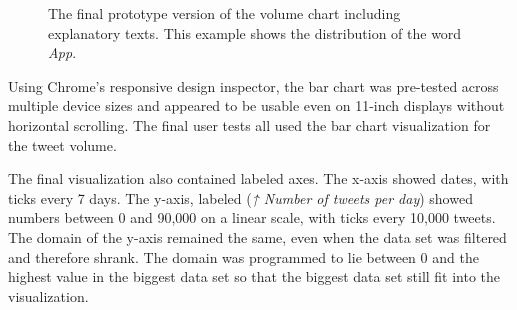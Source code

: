 \begin{figure}[htb!]
    \caption{The final prototype version of the volume chart including explanatory texts. This example shows the distribution of the word \emph{App}.}
    \label{fig:volume_barchart}
\end{figure}

Using Chrome's responsive design inspector, the bar chart was pre-tested across multiple device sizes and appeared to be usable even on 11-inch displays without horizontal scrolling. The final user tests all used the bar chart visualization for the tweet volume.

The final visualization also contained labeled axes. The x-axis showed dates, with ticks every 7 days. The y-axis, labeled  (\emph{↑ Number of tweets per day}) showed numbers between 0 and 90,000 on a linear scale, with ticks every 10,000 tweets. The domain of the y-axis remained the same, even when the data set was filtered and therefore shrank. The domain was programmed to lie between 0 and the highest value in the biggest data set so that the biggest data set still fit into the visualization.

